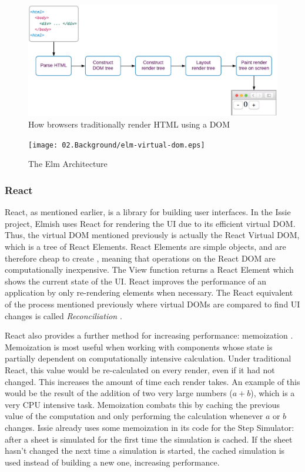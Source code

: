 \begin{figure} [h]
    \centering
    \includegraphics[width=\textwidth]{02.Background/traditionalDOM.eps}
    \caption{How browsers traditionally render HTML using a DOM \cite{virtualdom}}
    \label{fig:tradDOM}
\end{figure}

\begin{figure} [h]
    \centering
    \texttt{[image: 02.Background/elm-virtual-dom.eps]}
    \caption{The Elm Architecture \cite{virtualdom}}
    \label{fig:virtualDOM}
\end{figure}

\subsubsection{React}
React, as mentioned earlier, is a library for building user interfaces. In the Issie project, Elmish uses React for rendering the UI due to its efficient virtual DOM. Thus, the virtual DOM mentioned previously is actually the React Virtual DOM, which is a tree of React Elements. React Elements are simple objects, and are therefore cheap to create \cite{reactrender}, meaning that operations on the React DOM are computationally inexpensive. The View function returns a React Element which shows the current state of the UI. React improves the performance of an application by only re-rendering elements when necessary. The React equivalent of the process mentioned previously where virtual DOMs are compared to find UI changes is called \textit{Reconciliation} \cite{reactrender}.

React also provides a further method for increasing performance: memoization \cite{reactcache}. Memoization is most useful when working with components whose state is partially dependent on computationally intensive calculation. Under traditional React, this value would be re-calculated on every render, even if it had not changed. This increases the amount of time each render takes. An example of this would be the result of the addition of two very large numbers ($a + b$), which is a very CPU intensive task. Memoization combats this by caching the previous value of the computation and only performing the calculation whenever $a$ or $b$ changes. Issie already uses some memoization in its code for the Step Simulator: after a sheet is simulated for the first time the simulation is cached. If the sheet hasn't changed the next time a simulation is started, the cached simulation is used instead of building a new one, increasing performance. 
